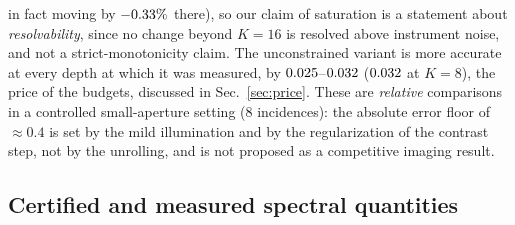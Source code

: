 \documentclass[journal,cmes,article,submit,moreauthors,pdftex]{Definitions/tsp}
\newcommand{\numv}[1]{#1}
\begin{document}
in fact moving by $\numv{\NumDepDeltaUncUniPct}\%$ there), so our claim of saturation is a statement about \emph{resolvability}, since no change beyond $K=16$ is resolved above instrument noise, and not a strict-monotonicity claim. The unconstrained variant is more accurate at every depth at
which it was measured, by $\numv{\NumPriceDeltaLo}$--$\numv{\NumPriceDeltaHi}$
($\numv{\NumPriceDelta}$ at $K=8$), the price of the
budgets, discussed in Sec.~\ref{sec:price}. These are \emph{relative} comparisons in a controlled small-aperture setting ($8$
incidences): the absolute error floor of $\approx0.4$ is set by the mild illumination and by the
regularization of the contrast step, not by the unrolling, and is not proposed as a competitive
imaging result.

\subsection{Certified and measured spectral quantities}
\end{document}
